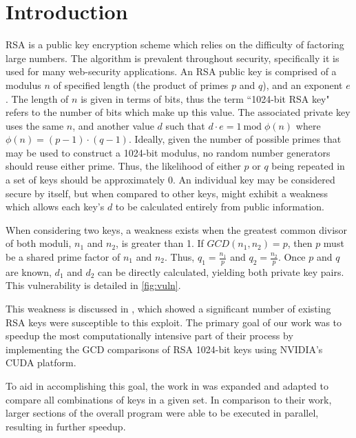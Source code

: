 \documentclass[12pt]{ucthesis}
\begin{document}
\pagestyle{plain}
\renewcommand{\baselinestretch}{1.66}


\chapter{Introduction}
\label{introduction}

RSA is a public key encryption scheme which relies on the difficulty of 
factoring large numbers. The algorithm is prevalent throughout security, 
specifically it is used for many web-security applications. An RSA public key is 
comprised of a modulus $n$ of specified length (the product of primes $p$ and 
$q$), and an exponent $e$. The length of $n$ is given in terms of bits, thus 
the term ``1024-bit RSA key" refers to the number of bits which make up this 
value. The associated private key uses the same $n$, and another value $d$ such 
that $d \cdot e = 1 \:\text{mod} \;\phi(n)$ where $\phi(n) = (p - 1) \cdot
(q - 1)$\cite{rsa}. Ideally, given the number of possible primes that may be
used to construct a 1024-bit modulus, no random number generators should reuse
either prime. Thus, the likelihood of either $p$ or $q$ being repeated in a set
of keys should be approximately 0. An individual key may be considered secure by
itself, but when compared to other keys, might exhibit a weakness which allows
each key's $d$ to be calculated entirely from public information.

When considering two keys, a weakness exists when the greatest common 
divisor of both moduli, $n_1$ and $n_2$, is greater than 1. If $GCD(n_1, 
n_2) = p$, then $p$ must be a shared prime factor of $n_1$ and $n_2$. Thus, 
$q_1 = \frac{n_1}{p}$ and $q_2 = \frac{n_2}{p}$. Once $p$ and $q$ are known, 
$d_1$ and $d_2$ can be directly calculated, yielding both private key pairs.
This vulnerability is detailed in \ref{fig:vuln}.

This weakness is discussed in \cite{lenstra2012ron}, which showed a 
significant number of existing RSA keys were susceptible to this exploit. The 
primary goal of our work was to speedup the most computationally intensive 
part of their process by implementing the GCD comparisons of RSA 1024-bit keys 
using NVIDIA's CUDA platform.

To aid in accomplishing this goal, the work in \cite{fujimoto2009high} was 
expanded and adapted to compare all combinations of keys in a given set. In 
comparison to their work, larger sections of the overall program were able to 
be executed in parallel, resulting in further speedup.
\end{document}
